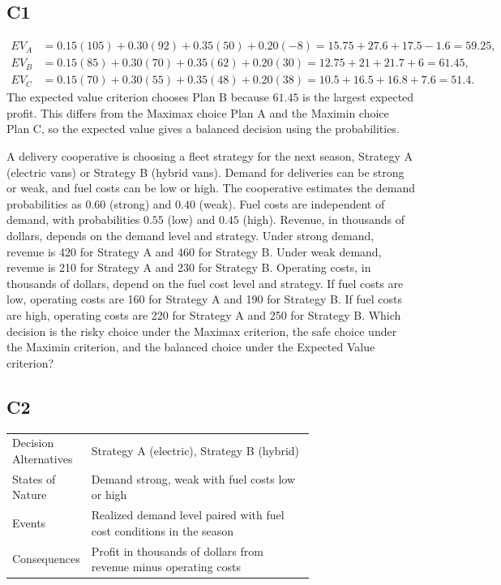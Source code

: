 		\subsection*{C1}
		\[
		\begin{aligned}
		EV_A &= 0.15(105)+0.30(92)+0.35(50)+0.20(-8)=15.75+27.6+17.5-1.6=59.25,\\
		EV_B &= 0.15(85)+0.30(70)+0.35(62)+0.20(30)=12.75+21+21.7+6=61.45,\\
		EV_C &= 0.15(70)+0.30(55)+0.35(48)+0.20(38)=10.5+16.5+16.8+7.6=51.4.
		\end{aligned}
		\]
		The expected value criterion chooses Plan B because $61.45$ is the largest expected profit. This differs from the Maximax choice Plan A and the Maximin choice Plan C, so the expected value gives a balanced decision using the probabilities.


		A delivery cooperative is choosing a fleet strategy for the next season, Strategy A (electric vans)
		or Strategy B (hybrid vans). Demand for deliveries can be strong or weak, and fuel costs can be low or high. The cooperative estimates the demand probabilities as $0.60$ (strong) and $0.40$ (weak). Fuel costs are independent of demand, with probabilities $0.55$ (low) and $0.45$ (high). Revenue, in thousands of dollars, depends on the demand level and strategy. Under strong demand, revenue is 420 for Strategy A and 460 for Strategy B. Under weak demand, revenue is 210 for Strategy A and 230 for Strategy B. Operating costs, in thousands of dollars, depend on the fuel cost level and strategy. If fuel costs are low, operating costs are 160 for Strategy A and 190 for Strategy B. If fuel costs are high, operating costs are 220 for Strategy A and 250 for Strategy B. Which decision is the risky choice under the Maximax criterion, the safe choice under the Maximin criterion, and the balanced choice under the Expected Value criterion?

		\subsection*{C2}
		\begin{center}
			\begin{tabular}{l p{0.74\linewidth}}
				\toprule
				Decision Alternatives & Strategy A (electric), Strategy B (hybrid) \\
				States of Nature & Demand strong, weak with fuel costs low or high \\
				Events & Realized demand level paired with fuel cost conditions in the season \\
				Consequences & Profit in thousands of dollars from revenue minus operating costs \\
				\bottomrule
			\end{tabular}
		\end{center}

